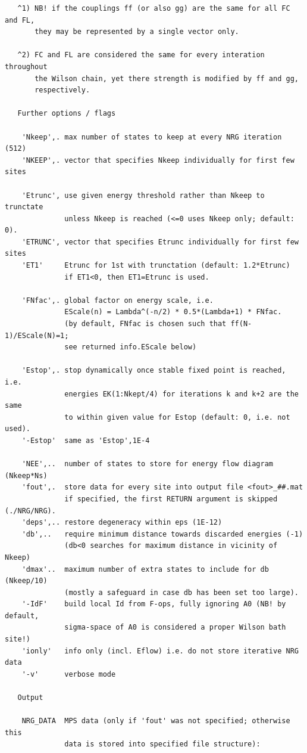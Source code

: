\documentclass[twoside,12pt]{article}
\begin{document}
\begin{verbatim}
   ^1) NB! if the couplings ff (or also gg) are the same for all FC and FL,
       they may be represented by a single vector only.
 
   ^2) FC and FL are considered the same for every interation throughout
       the Wilson chain, yet there strength is modified by ff and gg,
       respectively.
 
   Further options / flags
 
    'Nkeep',. max number of states to keep at every NRG iteration (512)
    'NKEEP',. vector that specifies Nkeep individually for first few sites
 
    'Etrunc', use given energy threshold rather than Nkeep to trunctate
              unless Nkeep is reached (<=0 uses Nkeep only; default: 0).
    'ETRUNC', vector that specifies Etrunc individually for first few sites
    'ET1'     Etrunc for 1st with trunctation (default: 1.2*Etrunc)
              if ET1<0, then ET1=Etrunc is used.
 
    'FNfac',. global factor on energy scale, i.e.
              EScale(n) = Lambda^(-n/2) * 0.5*(Lambda+1) * FNfac.
              (by default, FNfac is chosen such that ff(N-1)/EScale(N)=1;
              see returned info.EScale below)
 
    'Estop',. stop dynamically once stable fixed point is reached, i.e.
              energies EK(1:Nkept/4) for iterations k and k+2 are the same
              to within given value for Estop (default: 0, i.e. not used).
    '-Estop'  same as 'Estop',1E-4
 
    'NEE',..  number of states to store for energy flow diagram (Nkeep*Ns)
    'fout',.  store data for every site into output file <fout>_##.mat
              if specified, the first RETURN argument is skipped (./NRG/NRG).
    'deps',.. restore degeneracy within eps (1E-12)
    'db',..   require minimum distance towards discarded energies (-1)
              (db<0 searches for maximum distance in vicinity of Nkeep)
    'dmax'..  maximum number of extra states to include for db (Nkeep/10)
              (mostly a safeguard in case db has been set too large).
    '-IdF'    build local Id from F-ops, fully ignoring A0 (NB! by default,
              sigma-space of A0 is considered a proper Wilson bath site!)
    'ionly'   info only (incl. Eflow) i.e. do not store iterative NRG data
    '-v'      verbose mode
 
   Output
 
    NRG_DATA  MPS data (only if 'fout' was not specified; otherwise this
              data is stored into specified file structure):
 

\end{verbatim}
\end{document}
